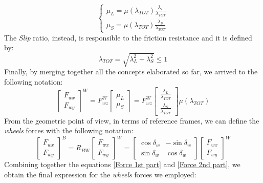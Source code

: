 \begin{equation}
\begin{cases}
\mu_{L} = \mu(\lambda_{TOT}) \frac{\lambda_{L}}{\lambda_{TOT}}\\
\mu_{S} = \mu(\lambda_{TOT}) \frac{\lambda_{S}}{\lambda_{TOT}}
\end{cases}
\end{equation}
The \textit{Slip} ratio, instead, is responsible to the friction resistance and it is defined by:
\begin{equation}
\lambda_{TOT} = \sqrt{\lambda_{L}^{2} + \lambda_{S}^{2}} \leq 1
\end{equation}
Finally, by merging together all the concepts elaborated so far, we arrived to the following notation:
\begin{equation} \label{Force 1st part}
\begin{bmatrix}
F_{wx} \\
F_{wy}
\end{bmatrix}^{W} =
F_{wz}^{W}
\begin{bmatrix}
\mu_{L} \\
\mu_{S}
\end{bmatrix} =
F_{wz}^{W}
\begin{bmatrix}
\frac{\lambda_{L}}{\lambda_{TOT}} \\
\frac{\lambda_{S}}{\lambda_{TOT}}
\end{bmatrix}
\mu(\lambda_{TOT})
\end{equation}
From the geometric point of view, in terms of reference frames, we can define the \textit{wheels} forces with the following notation:
\begin{equation} \label{Force 2nd part}
\begin{bmatrix}
F_{wx} \\
F_{wy}
\end{bmatrix}^{B} =
R_{BW}
\begin{bmatrix}
F_{wx} \\
F_{wy}
\end{bmatrix}^{W} =
\begin{bmatrix}
\cos\delta_{w} & -\sin\delta_{w} \\
\sin\delta_{w} & \cos\delta_{w}
\end{bmatrix}
\begin{bmatrix}
F_{wx} \\
F_{wy}
\end{bmatrix}^{W}
\end{equation}
Combining together the equations \ref{Force 1st part} and \ref{Force 2nd part}, we obtain the final expression for the \textit{wheels} forces we employed:
